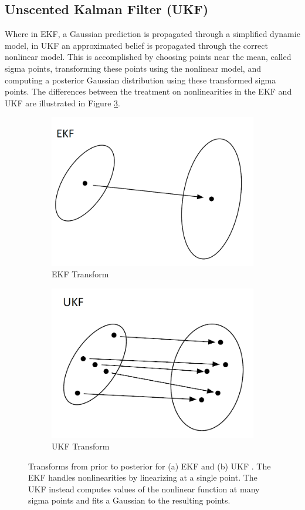 \documentclass[twoside]{article}
\begin{document}
\subsection{Unscented Kalman Filter (UKF)}

Where in EKF, a Gaussian prediction is propagated through a simplified dynamic model, in UKF an approximated belief is propagated through the correct nonlinear model. This is accomplished by choosing points near the mean, called sigma points, transforming these points using the nonlinear model, and computing a posterior Gaussian distribution using these transformed sigma points. The differences between the treatment on nonlinearities in the EKF and UKF are illustrated in Figure \ref{fig:EKF_vs_UKF_transform}.

\begin{figure}[t]
\centering
\begin{subfigure}{.5\textwidth}
  \centering
  \includegraphics[width=.75\linewidth]{EKF_transform.PNG}
  \caption{EKF Transform}
  \label{fig:EKF_transform}
\end{subfigure}%
\begin{subfigure}{.5\textwidth}
  \centering
  \includegraphics[width=.9\linewidth]{UKF_transform.PNG}
  \caption{UKF Transform}
  \label{fig:UKF_transform}
\end{subfigure}
\caption{Transforms from prior to posterior for (a) EKF \cite{Xmisc} and (b) UKF \cite{Xmisc}. The EKF handles nonlinearities by linearizing at a single point. The UKF instead computes values of the nonlinear function at many sigma points and fits a Gaussian to the resulting points.}
\label{fig:EKF_vs_UKF_transform}
\end{figure}
\end{document}
